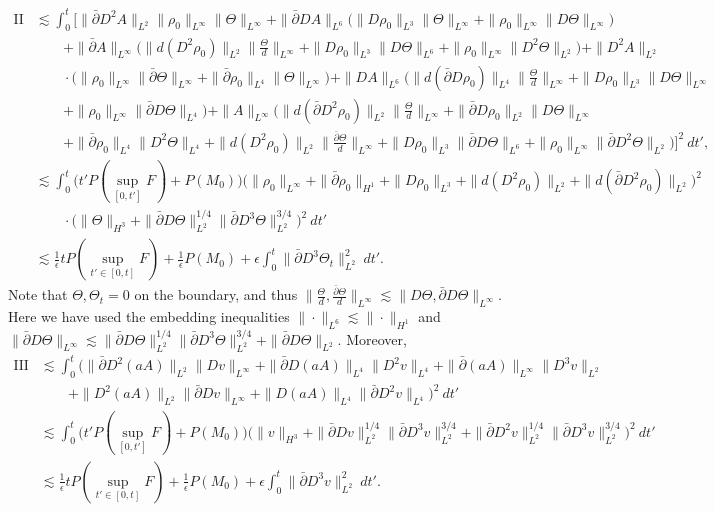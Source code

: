 \documentclass[12pt,a4paper]{amsart}
\numberwithin{equation}{section}
\theoremstyle{plain}
\theoremstyle{definition}
\newcommand{\bpartial}{\bar{\partial}}
\begin{document}
\begin{align*}
\mathrm{II}&\lesssim \int_{0}^{t} \bigg[\|\bpartial D^2 A\|_{L^2} \|\rho_0\|_{L^{\infty}} \|\Theta\|_{ L^{\infty}}
  +\|\bpartial D A\|_{L^6}\Big(\|D\rho_0\|_{ L^3} \|\Theta\|_{L^{\infty}}+\|\rho_0\|_{L^{\infty}} \|D\Theta\|_{ L^{\infty}}\Big)\\
  &\qquad +\|\bpartial  A\|_{ L^{\infty}}\Big(\|d (D^2\rho_0)\|_{L^2} \|\frac{\Theta}{d}\|_{ L^{\infty}}+\|D\rho_0\|_{L^3} \|D\Theta\|_{L^6}+\|\rho_0\|_{L^{\infty}}\|D^2\Theta\|_{L^2}\Big)  
  +\|D^2A\|_{L^2} \\
  &\qquad\cdot\Big(\|\rho_0\|_{L^{\infty}} \| \bpartial \Theta\|_{ L^{\infty}}+\|\bpartial\rho_0\|_{L^4}\|\Theta\|_{L^{\infty}}\Big)
  + \|DA\|_{L^6}\Big( \| d (\bpartial D\rho_0)\|_{L^4} \|\frac{\Theta}{d}\|_{ L^{\infty}}+\|D\rho_0\|_{L^3}\|D\Theta\|_{L^{\infty}}\\
&\qquad+ \|\rho_0\|_{L^{\infty}} \|\bpartial D\Theta\|_{ L^4}\Big) 
  +\|  A\|_{ L^{\infty}}\Big(\|d (\bpartial D^2\rho_0)\|_{L^2} \|\frac{\Theta}{d}\|_{ L^{\infty}}+\|\bpartial D\rho_0\|_{L^2} \|D\Theta\|_{L^{\infty}}\\
  &\qquad+\|\bpartial\rho_0\|_{L^4}\|D^2\Theta\|_{L^4}+\|d (D^2\rho_0)\|_{L^2} \|\frac{\bpartial\Theta}{d}\|_{ L^{\infty}}+\|D\rho_0\|_{L^3} \|\bpartial D\Theta\|_{L^6}+\|\rho_0\|_{L^{\infty}}\|\bpartial D^2\Theta\|_{L^2}\Big)\bigg]^2\ dt',\\
&\lesssim \int_{0}^{t} \Big( t'P(\sup\limits_{[0,t']}F)+P(M_0)  \Big)\Big(\|\rho_0\|_{L^{\infty}}+\|\bpartial \rho_0\|_{H^1}+\|D\rho_0\|_{L^3}+\|d(D^2 \rho_0)\|_{L^2}+\|d(\bpartial D^2 \rho_0)\|_{L^2}\Big)^2\\
&\qquad\cdot\Big(\|\Theta\|_{H^3}+\|\bpartial D\Theta\|_{L^2}^{1/4}\|\bpartial D^3\Theta\|_{L^2}^{3/4}\Big)^2 \ dt'\\
&\lesssim \frac{1}{\epsilon}tP(\sup\limits_{t'\in[0,t]}F)+\frac{1}{\epsilon}P(M_0)+\epsilon \int_{0}^{t}\|\bpartial D^3\Theta_t\|_{L^2}^2 \ dt'.
\end{align*}
Note that $\Theta, \Theta_t=0$ on the boundary, and thus $\|\frac{\Theta}{d}, \frac{\bpartial\Theta}{d}\|_{ L^{\infty}}\lesssim \|D\Theta, \bpartial D\Theta\|_{ L^{\infty}}$. Here we have used the embedding inequalities $\|\cdot\|_{L^6}\lesssim \|\cdot\|_{H^1}$ and $\|\bpartial D\Theta\|_{ L^{\infty}}\lesssim  \|\bpartial D\Theta\|_{L^2}^{1/4}\|\bpartial D^3\Theta\|_{L^2}^{3/4} +\|\bpartial D\Theta\|_{L^2}$. Moreover, 
\begin{align*}
\mathrm{III}&\lesssim 
\int_{0}^{t}  \Big(\|\bpartial D^2(aA)\|_{L^2}\|Dv\|_{L^{\infty}}
+\|\bpartial D (aA)\|_{L^4}\|D^2 v\|_{L^4}
+\|\bpartial (aA)\|_{L^{\infty}}\|D^3 v\|_{L^2}\\
&\qquad
+\|D^2 (aA)\|_{L^2} \| \bpartial Dv \|_{L^{\infty}}
+\|D(aA)\|_{L^4} \|\bpartial D^2v\|_{L^4}\Big)^2 \ dt'\\
&\lesssim \int_{0}^{t} \Big( t'P(\sup\limits_{[0,t']}F)+P(M_0)  \Big)
\Big(\|v\|_{H^3}+\|\bpartial Dv\|_{L^2}^{1/4}\|\bpartial D^3v\|_{L^2}^{3/4}+\|\bpartial D^2v\|_{L^2}^{1/4}\|\bpartial D^3v\|_{L^2}^{3/4}\Big)^2 \ dt'\\
&\lesssim  \frac{1}{\epsilon}tP(\sup\limits_{t'\in[0,t]}F)+\frac{1}{\epsilon}P(M_0)+\epsilon \int_{0}^{t}\|\bpartial D^3v\|_{L^2}^2 \ dt'.
\end{align*}
\end{document}
